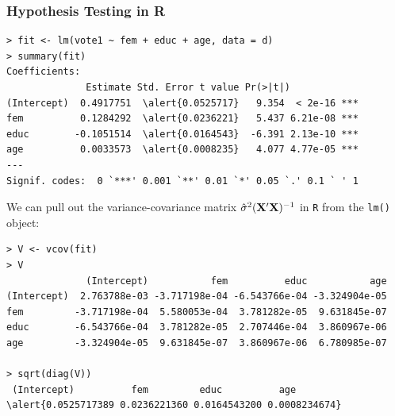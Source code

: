 \documentclass[xcolor=svgnames,9pt,english,aspectratio=169,t]{beamer}
\begin{document}

\begin{frame}[fragile]
\frametitle{Hypothesis Testing in R}

\begin{Verbatim}[fontsize=\footnotesize, frame=single, label=R Code, commandchars=\\\{\}]
> fit <- lm(vote1 ~ fem + educ + age, data = d)
> summary(fit)
Coefficients:
              Estimate Std. Error t value Pr(>|t|)
(Intercept)  0.4917751  \alert{0.0525717}   9.354  < 2e-16 ***
fem          0.1284292  \alert{0.0236221}   5.437 6.21e-08 ***
educ        -0.1051514  \alert{0.0164543}  -6.391 2.13e-10 ***
age          0.0033573  \alert{0.0008235}   4.077 4.77e-05 ***
---
Signif. codes:  0 `***' 0.001 `**' 0.01 `*' 0.05 `.' 0.1 ` ' 1
\end{Verbatim}

\footnotesize
We can pull out the variance-covariance matrix $\hat\sigma^2 (\mathbf{X}'\mathbf{X})^{-1}$ in \texttt{R} from the \texttt{lm()} object:
\begin{Verbatim}[fontsize=\footnotesize, frame=single, label=R Code, commandchars=\\\{\}]
> V <- vcov(fit)
> V
              (Intercept)           fem          educ           age
(Intercept)  2.763788e-03 -3.717198e-04 -6.543766e-04 -3.324904e-05
fem         -3.717198e-04  5.580053e-04  3.781282e-05  9.631845e-07
educ        -6.543766e-04  3.781282e-05  2.707446e-04  3.860967e-06
age         -3.324904e-05  9.631845e-07  3.860967e-06  6.780985e-07

> sqrt(diag(V))
 (Intercept)          fem         educ          age
\alert{0.0525717389 0.0236221360 0.0164543200 0.0008234674}
\end{Verbatim}

\end{frame}
\end{document}
